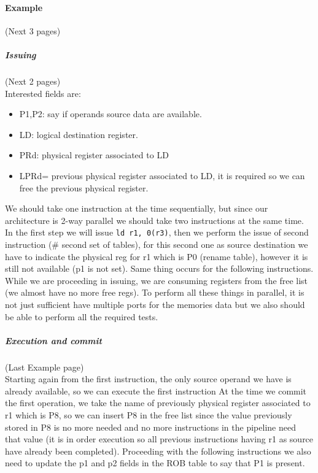 \paragraph{Example} (Next 3 pages)
\subparagraph{Issuing} (Next 2 pages) \\
Interested fields are:
\begin{itemize}
\item P1,P2: say if operands source data are available.
\item LD: logical destination register.
\item PRd: physical register associated to LD
\item LPRd= previous physical register associated to LD, it is required so we
  can free the previous physical register.
\end{itemize}
We should take one instruction at the time sequentially, but since our
architecture is 2-way parallel we should take two instructions at the same
time. In the first step we will issue \verb|ld r1, 0(r3)|, then we perform the
issue of second instruction (\# second set of tables), for this second one as
source destination we have to indicate the physical reg for r1 which is P0
(rename table), however it is still not available (p1 is not set). Same thing
occurs for the following instructions. While we are proceeding in issuing, we
are consuming registers from the free list (we almost have no more free regs).
To perform all these things in parallel, it is not just sufficient have
multiple ports for the memories data but we also should be able to perform all
the required tests.
\subparagraph{Execution and commit} (Last Example page)\\
Starting again from the first instruction, the only source operand we have is
already available, so we can execute the first instruction At the time we
commit the first operation, we take the name of previously physical register
associated to r1 which is P8, so we can insert P8 in the free list since the
value previously stored in P8 is no more needed and no more instructions in the
pipeline need that value (it is in order execution so all previous instructions
having r1 as source have already been completed). Proceeding with the following
instructions we also need to update the p1 and p2 fields in the ROB table to
say that P1 is present.
